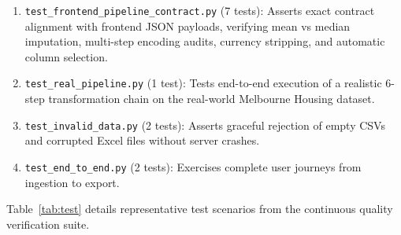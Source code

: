 \begin{enumerate}
  \item \texttt{test\_frontend\_pipeline\_contract.py} (7 tests): Asserts exact contract alignment with frontend JSON payloads, verifying mean vs median imputation, multi-step encoding audits, currency stripping, and automatic column selection.
  \item \texttt{test\_real\_pipeline.py} (1 test): Tests end-to-end execution of a realistic 6-step transformation chain on the real-world Melbourne Housing dataset.
  \item \texttt{test\_invalid\_data.py} (2 tests): Asserts graceful rejection of empty CSVs and corrupted Excel files without server crashes.
  \item \texttt{test\_end\_to\_end.py} (2 tests): Exercises complete user journeys from ingestion to export.
\end{enumerate}

Table~\ref{tab:test} details representative test scenarios from the continuous quality verification suite.

